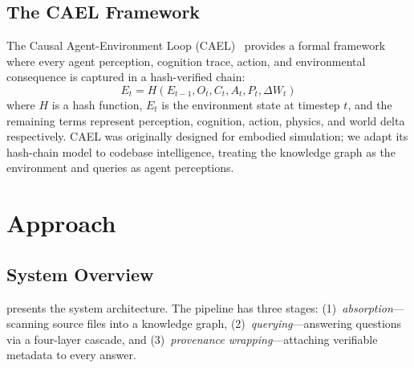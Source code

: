 \documentclass[conference]{IEEEtran}
\begin{document}
\subsection{The CAEL Framework}
\label{sec:background:cael}

The Causal Agent-Environment Loop
(CAEL)~\cite{Krzywoszyja2026CAEL} provides a formal framework where
every agent perception, cognition trace, action, and environmental
consequence is captured in a hash-verified chain:
\begin{equation}
  E_t = H(E_{t-1}, O_t, C_t, A_t, P_t, \Delta W_t)
  \label{eq:cael}
\end{equation}
where $H$ is a hash function, $E_t$ is the environment state at
timestep $t$, and the remaining terms represent perception, cognition,
action, physics, and world delta respectively. CAEL was originally
designed for embodied simulation; we adapt its hash-chain model to
codebase intelligence, treating the knowledge graph as the environment
and queries as agent perceptions.


\section{Approach}
\label{sec:approach}

\subsection{System Overview}
\label{sec:approach:overview}

 presents the system architecture. The pipeline
has three stages: (1)~\emph{absorption}---scanning source files into a
knowledge graph, (2)~\emph{querying}---answering questions via a
four-layer cascade, and (3)~\emph{provenance wrapping}---attaching
verifiable metadata to every answer.
\end{document}

